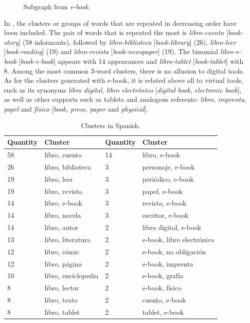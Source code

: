 \documentclass[english]{textolivre}
\begin{document}
\begin{figure}[htbp]
\begin{minipage}{0.45\textwidth}
 \caption{Subgraph from \textit{e-book}.}
 \label{fig6}
 \end{minipage}%
\end{figure}

In , the clusters or groups of words that are repeated in decreasing order have been included. The pair of words that is repeated the most is \textit{libro-cuento} [\textit{book-story}] (58 informants), followed by \textit{libro-biblioteca} [\textit{book-library}] (26), \textit{libro-leer} [\textit{book-reading}] (19) and \textit{libro-revista} [\textit{book-newspaper}] (19). The binomial \textit{libro-e-book} [\textit{book-e-book}] appears with 14 appearances and \textit{libro-tablet} [\textit{book-tablet}] with 8. Among the most common 3-word clusters, there is no allusion to digital tools. As for the clusters generated with e-book, it is related above all to virtual tools, such as its synonyms \textit{libro digital}, \textit{libro electrónico} [\textit{digital book}, \textit{electronic book}], as well as other supports such as tablets and analogous referents: \textit{libro, imprenta, papel} and \textit{físico} [\textit{book, press, paper} and \textit{physical}].

\begin{table}[h!]
\centering
\begin{threeparttable}
\caption{Clusters in Spanish.}
\label{tab05}
\centering
\begin{tabular}{l l l l}
\toprule
 \textbf{Quantity} & \textbf{Cluster} & \textbf{Quantity} & \textbf{Cluster} \\
 \midrule
58 & libro, cuento & 14 & libro, e-book \\
26 & libro, biblioteca & 3 & personaje, e-book \\
19 & libro, leer & 3 & periódico, e-book \\
19 & libro, revista & 3 & papel, e-book \\
14 & libro, e-book & 3 & revista, e-book \\
14 & libro, novela & 3 & escritor, e-book \\
14 & libro, autor & 2 & libro digital, e-book \\
13 & libro, literatura & 2 & e-book, libro electrónico \\
12 & libro, cómic & 2 & e-book, no obligación \\
12 & libro, página & 2 & e-book, imprenta \\
10 & libro, enciclopedia & 2 & e-book, grafía \\
8 & libro, lector & 2 & e-book, físico \\
8 & libro, texto & 2 & cuento, e-book \\
8 & libro, tablet & 2 & tablet, e-book \\
\bottomrule
\end{tabular}
\end{threeparttable}
\end{table}
\end{document}
